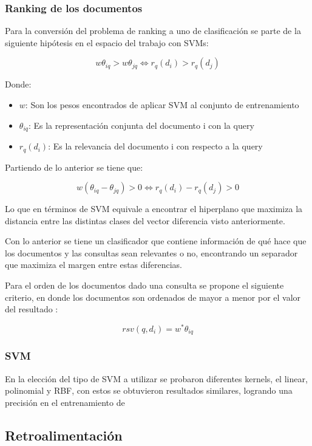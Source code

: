 \documentclass[runningheads]{llncs}
\begin{document}
\subsubsection{Ranking de los documentos}

Para la conversión del problema de ranking a uno de clasificación se parte de la siguiente
hipótesis en el espacio del trabajo con SVMs:

$$
w\theta_{iq} > w\theta_{jq} \iff r_q(d_i) > r_q(d_j)
$$

Donde:

\begin{itemize}

	\item $w$: Son los pesos encontrados de aplicar SVM al conjunto de entrenamiento
	\item $\theta_{iq}$: Es la representación conjunta del documento i con la query
	\item $r_q(d_i)$: Es la relevancia del documento i con respecto a la query
	
\end{itemize}

Partiendo de lo anterior se tiene que:

$$
w(\theta_{iq} - \theta_{jq}) > 0 \iff r_q(d_i) - r_q(d_j) > 0
$$

Lo que en términos de SVM equivale a encontrar el hiperplano que maximiza la distancia entre las distintas clases
del vector diferencia visto anteriormente.

Con lo anterior se tiene un clasificador que contiene información de qué hace que los documentos y las 
consultas sean relevantes o no, encontrando un separador que maximiza el margen entre estas diferencias.

Para el orden de los documentos dado una consulta se propone el siguiente criterio, en donde los documentos son
ordenados de mayor a menor por el valor del resultado \cite{rankSVM}:

$$
rsv(q, d_i) = w^* \theta_{iq}
$$

\subsubsection{SVM}

En la elección del tipo de SVM a utilizar se probaron diferentes kernels, el linear, polinomial y RBF, con estos
se obtuvieron resultados similares, logrando una precisión en el entrenamiento de 

\subsection{Retroalimentación}
\end{document}
